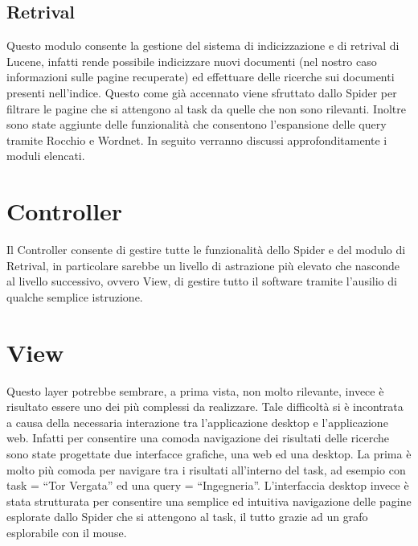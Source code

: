 \subsection{Retrival}
Questo modulo consente la gestione del sistema di indicizzazione e di retrival di Lucene, infatti rende possibile indicizzare nuovi documenti (nel nostro caso informazioni sulle pagine recuperate) ed effettuare delle ricerche sui documenti presenti nell'indice. Questo come già accennato viene sfruttato dallo Spider per filtrare le pagine che si attengono al task da quelle che non sono rilevanti. Inoltre sono state aggiunte delle funzionalità che consentono l'espansione delle query tramite Rocchio e Wordnet. In seguito verranno discussi approfonditamente i moduli elencati.
\section{Controller}
Il Controller consente di gestire tutte le funzionalità dello Spider e del modulo di Retrival, in particolare sarebbe un livello di astrazione più elevato che nasconde al livello successivo, ovvero View, di gestire tutto il software tramite l'ausilio di qualche semplice istruzione.
\section{View}
Questo layer potrebbe sembrare, a prima vista, non molto rilevante, invece è risultato essere uno dei più complessi da realizzare. Tale difficoltà si è incontrata a causa della necessaria interazione tra l'applicazione desktop e l'applicazione web. Infatti per consentire una comoda navigazione dei risultati delle ricerche sono state progettate due interfacce grafiche, una web ed una desktop. La prima è molto più comoda per navigare tra i risultati all'interno del task, ad esempio con task = ``Tor Vergata'' ed una query = ``Ingegneria''. L'interfaccia desktop invece è stata strutturata per consentire una semplice ed intuitiva navigazione delle pagine esplorate dallo Spider che si attengono al task, il tutto grazie ad un grafo esplorabile con il mouse.
